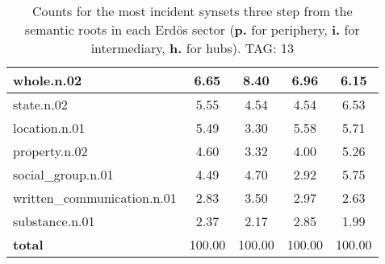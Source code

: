 \begin{table}[h!]
\begin{center}
\begin{tabular}{| l || c | c | c | c |}
whole.n.02 & 6.65  & 8.40  & 6.96  & 6.15 \\\hline
state.n.02 & 5.55  & 4.54  & 4.54  & 6.53 \\\hline
location.n.01 & 5.49  & 3.30  & 5.58  & 5.71 \\\hline
property.n.02 & 4.60  & 3.32  & 4.00  & 5.26 \\\hline
social\_group.n.01 & 4.49  & 4.70  & 2.92  & 5.75 \\\hline
written\_communication.n.01 & 2.83  & 3.50  & 2.97  & 2.63 \\\hline
substance.n.01 & 2.37  & 2.17  & 2.85  & 1.99 \\\hline\hline
{{\bf total}} & 100.00  & 100.00  & 100.00  & 100.00 \\\hline
\end{tabular}
\caption{Counts for the most incident synsets three step from the semantic roots in each Erd\"os sector ({\bf p.} for periphery, {\bf i.} for intermediary, {\bf h.} for hubs). TAG: 13}
\end{center}
\end{table}